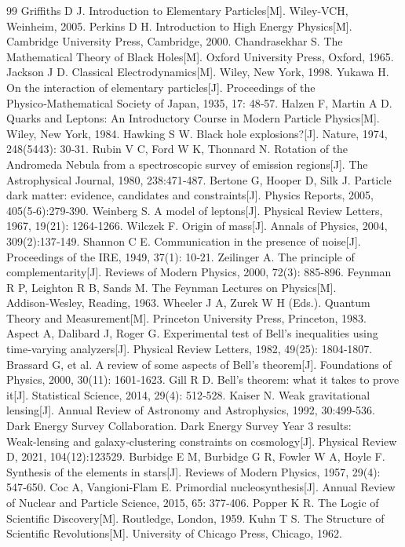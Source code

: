\documentclass[12pt,a4paper]{article}
\begin{document}
\begin{thebibliography}{99}
 Griffiths D J. Introduction to Elementary Particles[M]. Wiley‑VCH, Weinheim, 2005.
 Perkins D H. Introduction to High Energy Physics[M]. Cambridge University Press, Cambridge, 2000.
 Chandrasekhar S. The Mathematical Theory of Black Holes[M]. Oxford University Press, Oxford, 1965.
 Jackson J D. Classical Electrodynamics[M]. Wiley, New York, 1998.
 Yukawa H. On the interaction of elementary particles[J]. Proceedings of the Physico‑Mathematical Society of Japan, 1935, 17: 48‑57.
 Halzen F, Martin A D. Quarks and Leptons: An Introductory Course in Modern Particle Physics[M]. Wiley, New York, 1984.
 Hawking S W. Black hole explosions?[J]. Nature, 1974, 248(5443): 30‑31.
 Rubin V C, Ford W K, Thonnard N. Rotation of the Andromeda Nebula from a spectroscopic survey of emission regions[J]. The Astrophysical Journal, 1980, 238:471‑487.
 Bertone G, Hooper D, Silk J. Particle dark matter: evidence, candidates and constraints[J]. Physics Reports, 2005, 405(5‑6):279‑390.
 Weinberg S. A model of leptons[J]. Physical Review Letters, 1967, 19(21): 1264‑1266.
 Wilczek F. Origin of mass[J]. Annals of Physics, 2004, 309(2):137‑149.
 Shannon C E. Communication in the presence of noise[J]. Proceedings of the IRE, 1949, 37(1): 10‑21.
 Zeilinger A. The principle of complementarity[J]. Reviews of Modern Physics, 2000, 72(3): 885‑896.
 Feynman R P, Leighton R B, Sands M. The Feynman Lectures on Physics[M]. Addison‑Wesley, Reading, 1963.
 Wheeler J A, Zurek W H (Eds.). Quantum Theory and Measurement[M]. Princeton University Press, Princeton, 1983.
 Aspect A, Dalibard J, Roger G. Experimental test of Bell’s inequalities using time‑varying analyzers[J]. Physical Review Letters, 1982, 49(25): 1804‑1807.
 Brassard G, et al. A review of some aspects of Bell’s theorem[J]. Foundations of Physics, 2000, 30(11): 1601‑1623.
 Gill R D. Bell’s theorem: what it takes to prove it[J]. Statistical Science, 2014, 29(4): 512‑528.
 Kaiser N. Weak gravitational lensing[J]. Annual Review of Astronomy and Astrophysics, 1992, 30:499‑536.
 Dark Energy Survey Collaboration. Dark Energy Survey Year 3 results: Weak‑lensing and galaxy‑clustering constraints on cosmology[J]. Physical Review D, 2021, 104(12):123529.
 Burbidge E M, Burbidge G R, Fowler W A, Hoyle F. Synthesis of the elements in stars[J]. Reviews of Modern Physics, 1957, 29(4): 547‑650.
 Coc A, Vangioni‑Flam E. Primordial nucleosynthesis[J]. Annual Review of Nuclear and Particle Science, 2015, 65: 377‑406.
 Popper K R. The Logic of Scientific Discovery[M]. Routledge, London, 1959.
 Kuhn T S. The Structure of Scientific Revolutions[M]. University of Chicago Press, Chicago, 1962.
\end{thebibliography}
\end{document}
